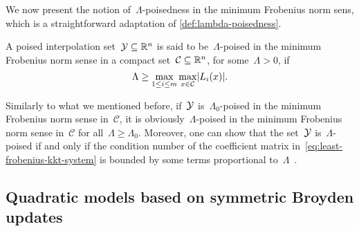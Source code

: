 We now present the notion of~$\Lambda$-poisedness in the minimum Frobenius norm sens, which is a straightforward adaptation of \cref{def:lambda-poisedness}.


\begin{definition} %
    \label{def:lambda-poisedness-minimum-norm}
    A poised interpolation set~$\xpt \subseteq \R^n$ is said to be~$\Lambda$-poised in the minimum Frobenius norm sense in a compact set~$\mathcal{C} \subseteq \mathbb{R}^n$, for some~$\Lambda > 0$, if
    \begin{equation*}
        \Lambda \ge \max_{1 \le i \le m} \max_{x \in \mathcal{C}} \abs{\lagp[i](x)}.
    \end{equation*}
\end{definition}

Similarly to what we mentioned before, if~$\xpt$ is~$\Lambda_0$-poised in the minimum Frobenius norm sense in~$\mathcal{C}$, it is obviously~$\Lambda$-poised in the minimum Frobenius norm sense in~$\mathcal{C}$ for all~$\Lambda \ge \Lambda_0$.
Moreover, one can show that the set~$\xpt$ is~$\Lambda$-poised if and only if the condition number of the coefficient matrix in~\cref{eq:least-frobenius-kkt-system} is bounded by some terms proportional to~$\Lambda$~\cite[thm.~5.8]{Conn_Scheinberg_Vicente_2009b}.


\subsection{Quadratic models based on symmetric Broyden updates}
\label{subsec:symmetric-broyden-updates}

